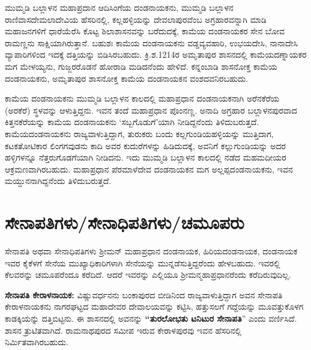 ಮುಮ್ಮಡಿ ಬಲ್ಲಾಳನ ಮಹಾಪ್ರದಾನ ಆದಿಸಿಂಗೆಯ ದಂಡನಾಯಕನು, ಮುಮ್ಮಡಿ ಬಲ್ಲಾಳನ ರಾಣಿವಾಸ\break ದೇಮಲಾದೇವಿಯ ಹೆಸರಿನಲ್ಲಿ, ಕಲ್ಲಹಳ್ಳಿಯನ್ನು ದೇವಲಾಪುರವೆಂಬ ಅಗ್ರಹಾರವನ್ನಾಗಿ ಮಾಡಿ ಮಹಾಜನಗಳಿಗೆ ಧಾರೆಯೆರೆಸಿ ಕೊಟ್ಟ ಶಿಲಾಶಾಸನವನ್ನು ಬರೆದುದಕ್ಕೆ, ಕಾಮೆಯ ದಂಡನಾಯಕರ ಸೇನ ಬೋವ ರಾಮಣ್ಣನು ಸಾಕ್ಷಿಯಾಗಿರುತ್ತಾನೆ. ಬಹುಶಃ ಕಾಮೆಯ ದಂಡನಾಯಕನು ವಡ್ಡವ್ಯವಹಾರಿ, ಉಭಯದೇಸಿ, ನಾನಾದೇಸಿ ವ್ಯಾಪಾರಿಗಳಿಂದ ಇದಕ್ಕೆ ದತ್ತಿಯನ್ನು ಬಿಡಿಸಿರಬಹುದು. ಕ್ರಿ.ಶ.1214ರ ಅಮೃತಾಪುರ ಶಾಸನದಲ್ಲಿ ಕಾಮೆಯದಣ್ನಾಯಕರ ಮಗ ಮೇಳಯ್ಯನು, ಗುಜ್ಜರರೊಡನೆ ಹೋರಾಡಿ ಮಡಿದನೆಂದು ಹೇಳಿದೆ. ಕನ್ನಂಬಾಡಿ ಶಾಸನೋಕ್ತ ಕಾಮೆಯ ದಂಡನಾಯಕನು, ಅಮೃತಾಪುರ ಶಾಸನೋಕ್ತ ಕಾಮೆಯ ದಂಡನಾಯಕನ ವಂಶದವನಿರಬಹುದು.

ಕಾಮೆಯ ದಂಡನಾಯಕನು ಮುಮ್ಮಡಿ ಬಲ್ಲಾಳನ ಕಾಲದಲ್ಲಿ ಮಹಾಪ್ರಧಾನ ದಂಡನಾಯಕನಾಗಿ ಅರೆನಕೆರೆಯ (ಅರಕೆರೆ) ಸ್ಥಳವನ್ನು ಆಳುತ್ತಿದ್ದನು. ಇವನ ತಂದೆ ಮಹಾಪ್ರಧಾನ ಪೊಂನಣ್ಣ. ಅನಾದಿ ಅಗ್ರಹಾರ ಬಲ್ಲಾಳನಪುರವಾದ ಕಿತ್ತನಕೆರೆಯನ್ನು ಕಾಮೆಯ ದಂಡನಾಯಕನು ‘ಸಬ್ಬಗೊಡುಗೆ’ಯಾಗಿ ನೀಡಿದ್ದನೆಂದು ತಿಳಿದುಬರುತ್ತದೆ. ಕಾಮೆಯದಂಡ\-ನಾಯಕನು ರಾಜ್ಯವಾಳುತ್ತಿದ್ದಾಗ, ತುರುಕರು ಬಂದು ಕಲ್ಲಗುಂಡಿಯಹಳ್ಳಿಯನ್ನು ಮುತ್ತಿದಾಗ, ಕಟಕತೋಟಿಕಾರ ಲಿಂಗಗವುಡನು ಕಾದಿ ಅವರ ಕುದುರೆಗಳನ್ನು ಹಿಡಿದುದಕ್ಕೆ, ಅವನಿಗೆ ಕಲ್ಲುಗುಂಡಿಯನ್ನು ಅದರ ಹಳ್ಳಿಗಳನ್ನೂ ನೆತ್ತರುಗೊಡಗೆಯಾಗಿ ನೀಡಿದನು. ಇದು ಮುಮ್ಮಡಿ ಬಲ್ಲಾಳನ ಕಾಲದಲ್ಲಿ ನಡೆದ ಮಹಮದೀಯರ ಆಕ್ರಮಣವಾಗಿರಬಹುದು. ಮಹಾಪ್ರಧಾನ ಪೆರಮಾಳೆದೇವ ದಂಡನಾಯಕನ ಮಗ ಅಲ್ಲಪ್ಪದಂಡನಾಯಕನು, ಇವನ ಮಯ್ದುನನಾಗಿದ್ದನೆಂದು ತಿಳಿದುಬರುತ್ತದೆ.


\section*{ಸೇನಾಪತಿಗಳು/ಸೇನಾಧಿಪತಿಗಳು/ಚಮೂಪರು}

ಸೇನಾಪತಿ ಅಥವಾ ಸೇನಾಧಿಪತಿಗಳು ಶ‍್ರೀಮನ್​ ಮಹಾಪ್ರಧಾನ ದಂಡನಾಯಕ, ಹಿರಿಯದಂಡನಾಯಕ, ದಂಡನಾಯಕ ಇವರ ಕೈಕೆಳಗೆ ಸೇನೆಯ ಮುಖ್ಯಾಧಿಕಾರಿಗಳಾಗಿ ಸೇನೆಯನ್ನು ಮುನ್ನಡೆಸುತ್ತಿದ್ದರೆಂದು ಹೇಳಬಹುದು. ಇವರಲ್ಲಿ ಕೆಲವರನ್ನು ಚಮೂಪರೆಂದೂ ಕರೆದಿದೆ. ಆದರೆ ಇವರನ್ನು ಎಲ್ಲಿಯೂ ಶ‍್ರೀಮನ್ಮಹಾಪ್ರಧಾನರೆಂದು ಕರೆದಿರುವುದಿಲ್ಲ.

\vskip 4pt

\textbf{ಸೇನಾಪತಿ ಕೇರಾಳನಾಯಕ:} ವಿಷ್ಣುವರ್ಧನನು ಬಂಕಾಪುರದ ಬೀಡಿನಿಂದ ರಾಜ್ಯವಾಳುತ್ತಿದ್ದಾಗ ಅವನ ಸೇನಾಪತಿ ಕೇರಾಳನಾಯಕನು ನಾಗರಘಟ್ಟದ ಮಹಾದೇವರ ದೇವಾಲಯವನ್ನು ಕಟ್ಟಿಸಿ, ಹತ್ತುಸಲಗೆ ಗದ್ದೆಯನ್ನು ಮೂವತ್ತುಕೊಳಗ ಕಾಡಕ್ಕಿಯನ್ನು ದತ್ತಿಬಿಟ್ಟನು. ಈ ಶಾಸನದಲ್ಲಿ ಅವನನ್ನು \textbf{“ತುರಲೋಭತು ಟನಿಟುರ ಸೇನಾಪತಿ}” ಎಂದು ವರ್ಣಿಸಿದೆ. ಶಾಸನ ತ್ರುಟಿತವಾಗಿದೆ. ರಾಮನಾಥಪುರದ ಸಮೀಪ ಇರುವ ಕೇರಾಳಪುರವು ಇವನ ಹೆಸರಿನಲ್ಲಿ ನಿರ್ಮಿತವಾಗಿರಬಹುದು.

